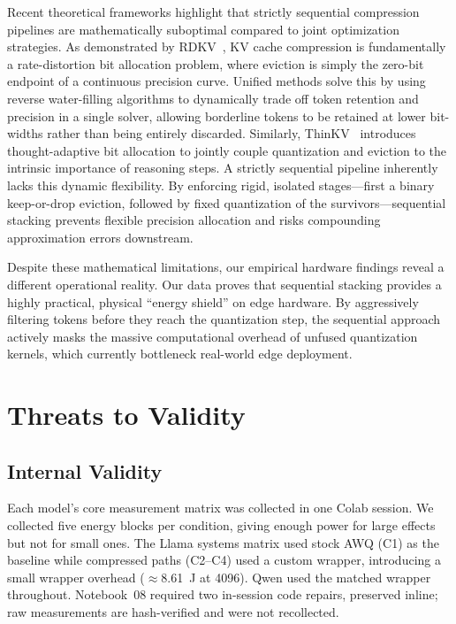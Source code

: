 \documentclass[sigconf,nonacm]{acmart}
\begin{document}
Recent theoretical frameworks highlight that strictly sequential compression pipelines are mathematically suboptimal compared to joint optimization strategies. As demonstrated by RDKV~\cite{zhang_rdkv_2026}, KV cache compression is fundamentally a rate-distortion bit allocation problem, where eviction is simply the zero-bit endpoint of a continuous precision curve. Unified methods solve this by using reverse water-filling algorithms to dynamically trade off token retention and precision in a single solver, allowing borderline tokens to be retained at lower bit-widths rather than being entirely discarded. Similarly, ThinKV~\cite{ramachandran_thinkv_2026} introduces thought-adaptive bit allocation to jointly couple quantization and eviction to the intrinsic importance of reasoning steps. A strictly sequential pipeline inherently lacks this dynamic flexibility. By enforcing rigid, isolated stages---first a binary keep-or-drop eviction, followed by fixed quantization of the survivors---sequential stacking prevents flexible precision allocation and risks compounding approximation errors downstream.

Despite these mathematical limitations, our empirical hardware findings reveal a different operational reality. Our data proves that sequential stacking provides a highly practical, physical ``energy shield'' on edge hardware. By aggressively filtering tokens before they reach the quantization step, the sequential approach actively masks the massive computational overhead of unfused quantization kernels, which currently bottleneck real-world edge deployment.


\section{Threats to Validity}

\subsection{Internal Validity}
Each model's core measurement matrix was collected in one Colab session. We
collected five energy blocks per condition, giving enough power for large effects
but not for small ones. The Llama systems matrix used stock AWQ (C1) as the
baseline while compressed paths (C2--C4) used a custom wrapper, introducing a
small wrapper overhead ($\approx$8.61~J at 4096). Qwen used the matched wrapper
throughout. Notebook~08 required two in-session code repairs, preserved inline;
raw measurements are hash-verified and were not recollected.
\end{document}
